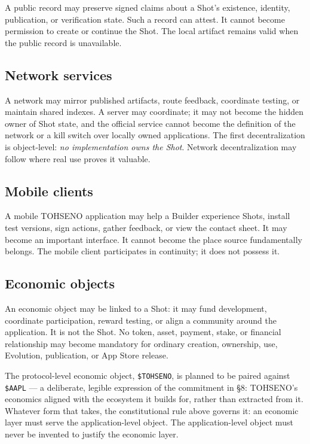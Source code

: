 \documentclass[11pt]{article}
\newcommand{\TOH}{TOHSENO}
\begin{document}
A public record may preserve signed claims about a Shot's existence,
identity, publication, or verification state. Such a record can attest.
It cannot become permission to create or continue the Shot. The local
artifact remains valid when the public record is unavailable.

\subsection{Network services}

A network may mirror published artifacts, route feedback, coordinate
testing, or maintain shared indexes. A server may coordinate; it may not
become the hidden owner of Shot state, and the official service cannot
become the definition of the network or a kill switch over locally owned
applications. The first decentralization is object-level: \emph{no
implementation owns the Shot}. Network decentralization may follow where
real use proves it valuable.

\subsection{Mobile clients}

A mobile \TOH{} application may help a Builder experience Shots, install
test versions, sign actions, gather feedback, or view the contact sheet.
It may become an important interface. It cannot become the place source
fundamentally belongs. The mobile client participates in continuity; it
does not possess it.

\subsection{Economic objects}

An economic object may be linked to a Shot: it may fund development,
coordinate participation, reward testing, or align a community around
the application. It is not the Shot. No token, asset, payment, stake, or
financial relationship may become mandatory for ordinary creation,
ownership, use, Evolution, publication, or App Store release.

The protocol-level economic object, \texttt{\$TOHSENO}, is planned to be
paired against \texttt{\$AAPL} --- a deliberate, legible expression of
the commitment in §8: \TOH{}'s economics aligned with the ecosystem it
builds for, rather than extracted from it. Whatever form that takes, the
constitutional rule above governs it: an economic layer must serve the
application-level object. The application-level object must never be
invented to justify the economic layer.
\end{document}
